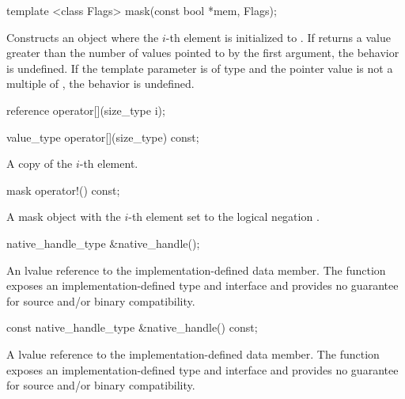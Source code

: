 \begin{itemdecl}
template <class Flags> mask(const bool *mem, Flags);
\end{itemdecl}
\begin{itemdescr}
  \pnum\effects Constructs an object where the $i$-th element is initialized to  \foralli.
  \pnum\remarks If  returns a value greater than the number of values pointed to by the first argument, the behavior is undefined.
  \pnum\remarks If the  template parameter is of type  and the pointer value is not a multiple of , the behavior is undefined.
\end{itemdescr}

\begin{itemdecl}
reference operator[](size_type i);
\end{itemdecl}
\begin{itemdescr}
  \dataparElementReference
\end{itemdescr}

\begin{itemdecl}
value_type operator[](size_type) const;
\end{itemdecl}
\begin{itemdescr}
  \pnum\returns A copy of the $i$-th element.
\end{itemdescr}

\begin{itemdecl}
mask operator!() const;
\end{itemdecl}
\begin{itemdescr}
  \pnum\returns A mask object with the $i$-th element set to the logical negation \foralli.
\end{itemdescr}

\begin{itemdecl}
native_handle_type &native_handle();
\end{itemdecl}
\begin{itemdescr}
  \pnum\returns An lvalue reference to the implementation-defined data member.
  \pnum\realnote The function exposes an implementation-defined type and interface and provides no guarantee for source and/or binary compatibility.
\end{itemdescr}

\begin{itemdecl}
const native_handle_type &native_handle() const;
\end{itemdecl}
\begin{itemdescr}
  \pnum\returns A \const lvalue reference to the implementation-defined data member.
  \pnum\realnote The function exposes an implementation-defined type and interface and provides no guarantee for source and/or binary compatibility.
\end{itemdescr}

